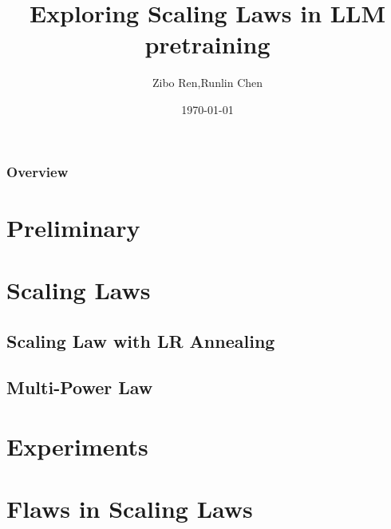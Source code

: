 \documentclass{beamer}
\title[Scaling Laws]{
    Exploring Scaling Laws in LLM pretraining
}
\author{Zibo Ren,Runlin Chen} %
\institute[PKU] %
{
    Peking University \\ %
    \medskip
    \textit{2200010626@stu.pku.edu.cn,2200010848@stu.pku.edu.cn} %
}
\date{\today} %
\begin{document}
    \begin{frame}
        \titlepage %
    \end{frame}

    \begin{frame}
        \frametitle{Overview} %
        \tableofcontents %
    \end{frame}



    \section{Preliminary}\label{sec:preliminary}


    \section{Scaling Laws}\label{sec:scalinglaws}

    \subsection{Scaling Law with LR Annealing}\label{subsec:LRA}

    \subsection{Multi-Power Law}\label{subsec:MPL}


    \section{Experiments}\label{sec:experiments}


    \section{Flaws in Scaling Laws}\label{sec:flaws}

    \begin{frame}

    \end{frame}
\end{document}
